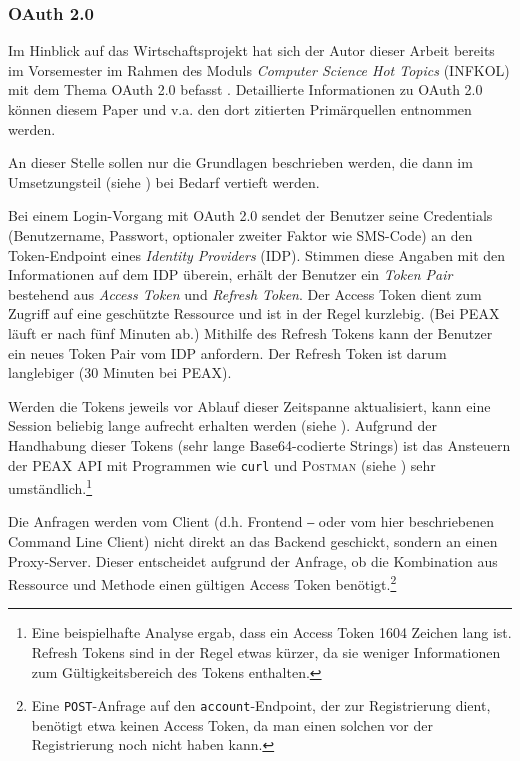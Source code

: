 \subsubsection{OAuth 2.0}

Im Hinblick auf das Wirtschaftsprojekt hat sich der Autor dieser Arbeit bereits im Vorsemester im Rahmen des Moduls \textit{Computer Science Hot Topics} (INFKOL) mit dem Thema OAuth 2.0 befasst \cite{infkol-oauth}. Detaillierte Informationen zu OAuth 2.0 können diesem Paper und v.a. den dort zitierten Primärquellen entnommen werden.

An dieser Stelle sollen nur die Grundlagen beschrieben werden, die dann im Umsetzungsteil (siehe ) bei Bedarf vertieft werden.

Bei einem Login-Vorgang mit OAuth 2.0 sendet der Benutzer seine Credentials (Benutzername, Passwort, optionaler zweiter Faktor wie SMS-Code) an den Token-Endpoint eines \textit{Identity Providers} (IDP). Stimmen diese Angaben mit den Informationen auf dem IDP überein, erhält der Benutzer ein \textit{Token Pair} bestehend aus \textit{Access Token} und \textit{Refresh Token}. Der Access Token dient zum Zugriff auf eine geschützte Ressource und ist in der Regel kurzlebig. (Bei PEAX läuft er nach fünf Minuten ab.) Mithilfe des Refresh Tokens kann der Benutzer ein neues Token Pair vom IDP anfordern. Der Refresh Token ist darum langlebiger (30 Minuten bei PEAX).

Werden die Tokens jeweils vor Ablauf dieser Zeitspanne aktualisiert, kann eine Session beliebig lange aufrecht erhalten werden (siehe ). Aufgrund der Handhabung dieser Tokens (sehr lange Base64-codierte Strings) ist das Ansteuern der PEAX API mit Programmen wie \texttt{curl} und \textsc{Postman} (siehe ) sehr umständlich.\footnote{Eine beispielhafte Analyse ergab, dass ein Access Token 1604 Zeichen lang ist. Refresh Tokens sind in der Regel etwas kürzer, da sie weniger Informationen zum Gültigkeitsbereich des Tokens enthalten.}

Die Anfragen werden vom Client (d.h. Frontend ‒ oder vom hier beschriebenen Command Line Client) nicht direkt an das Backend geschickt, sondern an einen Proxy-Server. Dieser entscheidet aufgrund der Anfrage, ob die Kombination aus Ressource und Methode einen gültigen Access Token benötigt.\footnote{Eine \texttt{POST}-Anfrage auf den \texttt{account}-Endpoint, der zur Registrierung dient, benötigt etwa keinen Access Token, da man einen solchen vor der Registrierung noch nicht haben kann.} 

